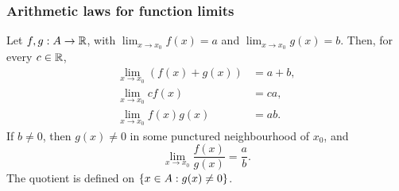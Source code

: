 \documentclass[11pt,a4paper]{amsart}
\begin{document}
\subsubsection{Arithmetic laws for function limits}

\begin{theorem}\label{thm:function-limit-laws}
  Let \(f,g:A\to\mathbb{R}\), with
  \(\lim_{x\to x_0}f(x)=a\) and \(\lim_{x\to x_0}g(x)=b\).
  Then, for every \(c\in\mathbb{R}\),
  \begin{align*}
    \lim_{x\to x_0}(f(x)+g(x))&=a+b,\\
    \lim_{x\to x_0}cf(x)&=ca,\\
    \lim_{x\to x_0}f(x)g(x)&=ab.
  \end{align*}
  If \(b\neq0\), then \(g(x)\neq0\) in some punctured
  neighbourhood of \(x_0\), and
  \[
    \lim_{x\to x_0}\frac{f(x)}{g(x)}=\frac ab.
  \]
  The quotient is defined on \(\left\lbrace x\in A:g(x)\neq0\right\rbrace\).
\end{theorem}
\end{document}
